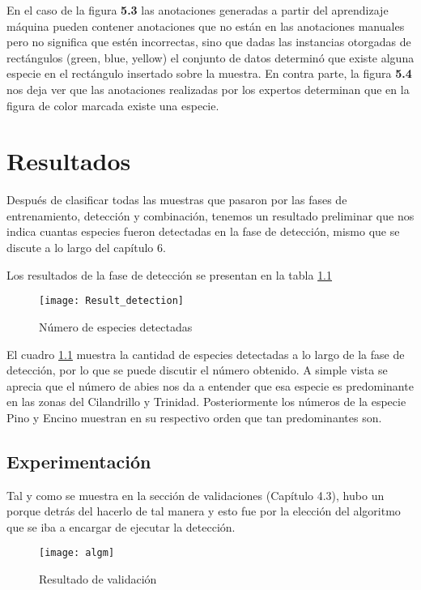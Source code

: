 En el caso de la figura \textbf{5.3} las anotaciones generadas a partir del aprendizaje máquina pueden contener anotaciones que no están en las anotaciones manuales pero no significa que estén incorrectas, sino que dadas las instancias otorgadas de rectángulos (green, blue, yellow) el conjunto de datos determinó que existe alguna especie en el rectángulo insertado sobre la muestra. En contra parte, la figura \textbf{5.4} nos deja ver que las anotaciones realizadas por los expertos determinan que en la figura de color marcada existe una especie.

\break

\chapter{Resultados}
Después de clasificar todas las muestras que pasaron por las fases de entrenamiento, detección y combinación, tenemos un resultado preliminar que nos indica cuantas especies fueron detectadas en la fase de detección, mismo que se discute a lo largo del capítulo 6.


Los resultados de la fase de detección se presentan en la tabla \ref{Numero de especies}

\begin{figure}[H]
  \centering
  \begin{minipage}[b]{0.5\textwidth}
        \texttt{[image: Result\_detection]}
    \caption{Número de especies detectadas}
  \end{minipage}
  \label{Numero de especies}
\end{figure}

El cuadro \ref{Numero de especies} muestra la cantidad de especies detectadas a lo largo de la fase de detección, por lo que se puede discutir el número obtenido. A simple vista se aprecia que el número de abies nos da a entender que esa especie es predominante en las zonas del Cilandrillo y Trinidad. Posteriormente los números de la especie Pino y Encino muestran en su respectivo orden que tan predominantes son.

\section{Experimentación}
Tal y como se muestra en la sección de validaciones (Capítulo 4.3), hubo un porque detrás del hacerlo de tal manera y esto fue por la elección del algoritmo que se iba a encargar de ejecutar la detección.


\begin{figure}[H]
  \centering
  \begin{minipage}[b]{0.8\textwidth}
        \texttt{[image: algm]}
    \caption{Resultado de validación}
  \end{minipage}
\end{figure}


